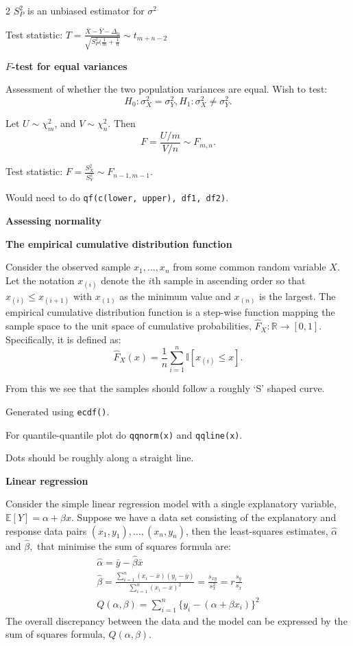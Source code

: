 \documentclass[10pt]{extarticle}
\theoremstyle{definition}
\theoremstyle{remark}
\newcommand{\R}{\mathbb{R}}
\newcommand{\E}{\mathbb{E}}
\begin{document}
\begin{multicols}{2}
    $S_P^2$ is an unbiased estimator for $\sigma^2$

    Test statistic: $T = \frac{\bar{X} - \bar{Y} - \Delta_0}{\sqrt{S^2_P(\frac{1}{m} + \frac{1}{n}}} \sim t_{m+n-2} $

    \noindent
    \textbf{$F$-test for equal variances}

    Assessment of whether the two population variances are equal. Wish to test: 
    \[ H_0: \sigma^2_X = \sigma^2_Y, H_1: \sigma^2_X \neq \sigma^2_Y.\]

    Let $U \sim \chi^2_m$, and $V \sim \chi^2_n.$ Then 
    \[ F = \frac{U / m}{V / n} \sim F_{m,n}.\]

    Test statistic: $F = \frac{S^2_X}{S^2_Y} \sim F_{n-1, m-1}.$ 

    Would need to do \verb|qf(c(lower, upper), df1, df2)|. 

    \noindent
    \textbf{Assessing normality}

    \textbf{The empirical cumulative distribution function}

    Consider the observed sample $x_1, \ldots, x_n$ from some common random
    variable $X$. Let the notation $x_{(i )}$ denote the $i$th sample in ascending
    order so that $x_{(i )} \leq x_{(i +1)}$ with $x_{(1)}$ as the minimum value and $x_{(n)}$ 
    is the largest. The empirical cumulative distribution function is a
    step-wise function mapping the sample space to the unit space of cumulative
    probabilities, $\hat{F}_X : \R \to [0, 1]$. Specifically, it is defined as: \[
    \hat{F}_X(x) = \frac{1}{n} \sum^n_{i=1} \mathbb{I} [ x_{(i)} \leq x]. \]

    From this we see that the samples should follow a roughly `S' shaped curve.  

    Generated using \verb|ecdf()|.

    For quantile-quantile plot do \verb|qqnorm(x)| and \verb|qqline(x)|.

    Dots should be roughly along a straight line.

    \noindent
    {\large\textbf{Linear regression}}

    Consider the simple linear regression model with a single explanatory
    variable, $\E [Y ] = \alpha+\beta x$. Suppose we have a data set consisting
    of the
    explanatory and response data pairs $(x_1 , y_1 ), \ldots , (x_n , y_n )$,
    then the least-squares estimates, $\hat{\alpha}$ and $\hat{\beta},$ that
    minimise the sum
    of squares
    formula are:
    \begin{gather*}
        \hat{\alpha} = \bar{y} - \hat{\beta}\bar{x} \\
        \hat{\beta} = \frac{\sum_{i=1}^n (x_i - \bar{x})(y_i - \bar{y})}{\sum_{i=1}^n (x_i - \bar{x})^2} = \frac{s_{xy}}{s^2_x} = r\frac{s_{y}}{s_x} \\
        Q(\alpha,\beta) = \sum_{i=1}^n \{y_i - (\alpha + \beta x_i)\}^2
    \end{gather*}
    The overall discrepancy between the data and the model can be expressed by the
    sum of squares formula, $Q(\alpha, \beta)$. 


\end{multicols}
\end{document}
